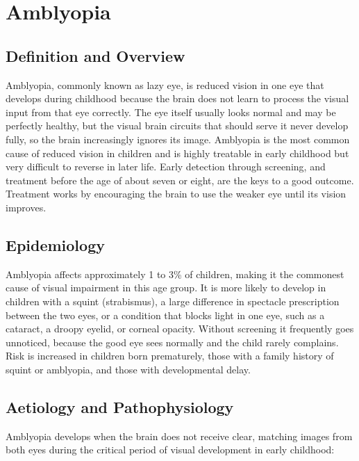 \chapter{Amblyopia}

\section*{Definition and Overview}
Amblyopia, commonly known as lazy eye, is reduced vision in one eye that develops during childhood because the brain does not learn to process the visual input from that eye correctly. The eye itself usually looks normal and may be perfectly healthy, but the visual brain circuits that should serve it never develop fully, so the brain increasingly ignores its image. Amblyopia is the most common cause of reduced vision in children and is highly treatable in early childhood but very difficult to reverse in later life. Early detection through screening, and treatment before the age of about seven or eight, are the keys to a good outcome. Treatment works by encouraging the brain to use the weaker eye until its vision improves.

\section*{Epidemiology}
Amblyopia affects approximately 1 to 3\% of children, making it the commonest cause of visual impairment in this age group. It is more likely to develop in children with a squint (strabismus), a large difference in spectacle prescription between the two eyes, or a condition that blocks light in one eye, such as a cataract, a droopy eyelid, or corneal opacity. Without screening it frequently goes unnoticed, because the good eye sees normally and the child rarely complains. Risk is increased in children born prematurely, those with a family history of squint or amblyopia, and those with developmental delay.

\section*{Aetiology and Pathophysiology}
Amblyopia develops when the brain does not receive clear, matching images from both eyes during the critical period of visual development in early childhood:

